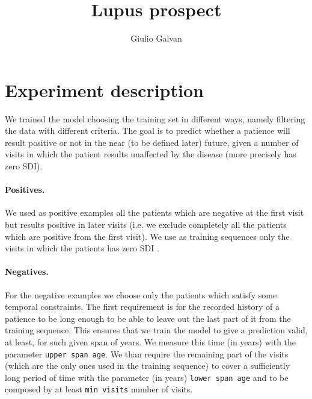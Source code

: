 \documentclass{article}
\title{Lupus prospect}
\author{Giulio Galvan}
\begin{document}
\section{Experiment description}

We trained the model choosing the training set in different ways, namely filtering the data with different criteria. The goal is to predict whether a patience will result positive or not in the near (to be defined later) future, given a number of visits in which the patient results unaffected by the disease (more precisely has zero SDI).

\paragraph{Positives.} We used as positive examples all the patients which are negative at the first visit but results positive in later visits (i.e. we exclude completely all the patients which are positive from the first visit). We use as training sequences only the visits in which the patients has zero SDI .

\paragraph{Negatives.} For the negative examples we choose only the patients which satisfy some temporal constraints. The first requirement is for the recorded history of a patience to be long enough to be able to leave out the last part of it from the training sequence. This ensures that we train the model to give a prediction valid, at least, for such given span of years. We measure this time (in years) with the parameter \texttt{upper span age}.  We than require the remaining part of the visits (which are the only ones used in the training sequence) to cover a sufficiently long period of time with the parameter (in years) \texttt{lower span age} and to be composed by at least \texttt{min visits} number of visits.
\end{document}

